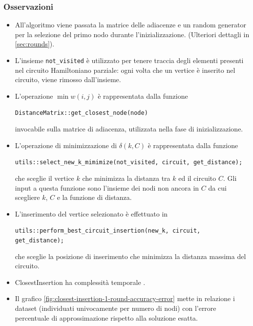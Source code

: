 \subsubsection{Osservazioni}

\begin{itemize}
    \item All'algoritmo viene passata la matrice delle adiacenze e un
      random generator per la selezione del primo nodo durante
      l'inizializzazione. (Ulteriori dettagli in
      \ref{sec:rounds}).\\

    \item L'insieme \texttt{not_visited} è utilizzato per
      tenere traccia degli elementi presenti nel circuito Hamiltoniano
      parziale: ogni volta che un vertice è inserito nel circuito,
      viene rimosso dall'insieme.\\

    \item L'operazione $\min w(i, j)$ è rappresentata dalla funzione
    \begin{center}
        \texttt{DistanceMatrix::get_closest_node(node)}
    \end{center}
    invocabile sulla matrice di adiacenza, utilizzata nella fase di
    inizializzazione.\\

    \item L'operazione di minimizzazione di $\delta(k, C)$ è
      rappresentata dalla funzione
    \begin{center}
        \texttt{utils::select_new_k_mimimize(not_visited, circuit, get_distance);}
    \end{center}
    che sceglie il vertice $k$ che minimizza la distanza tra $k$
    ed il circuito $C$. Gli input a questa funzione sono l'insieme
    dei nodi non ancora in $C$ da cui scegliere $k$, $C$ e la
    funzione di distanza.\\

    \item L'inserimento del vertice selezionato è effettuato in
    \begin{center}
        \texttt{utils::perform_best_circuit_insertion(new_k, circuit, get_distance);}
    \end{center}
    che sceglie la posizione di inserimento che minimizza la distanza
    massima del circuito.\\

    \item ClosestInsertion ha complessità temporale \complexityHeuristicInsertionTime{}. \\

    \item Il grafico
\ref{fig:closest-insertion-1-round-accuracy-error} mette in relazione i dataset (individuati univocamente per numero di nodi) con l'errore percentuale di approssimazione rispetto alla soluzione esatta.
\end{itemize}

